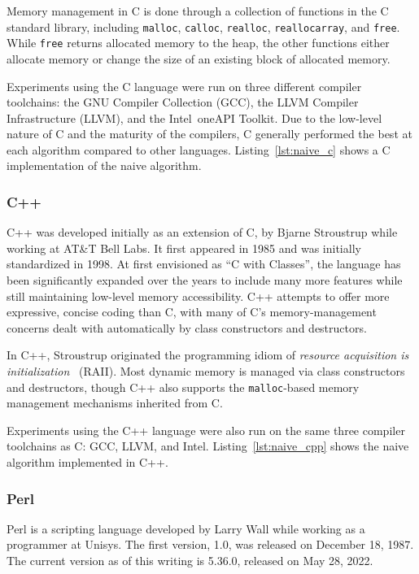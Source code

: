 Memory management in C is done through a collection of functions in the C standard library, including \texttt{malloc}, \texttt{calloc}, \texttt{realloc}, \texttt{reallocarray}, and \texttt{free}. While \texttt{free} returns allocated memory to the heap, the other functions either allocate memory or change the size of an existing block of allocated memory.

Experiments using the C language were run on three different compiler toolchains: the GNU Compiler Collection (GCC), the LLVM Compiler Infrastructure (LLVM), and the Intel\textregistered~oneAPI Toolkit. Due to the low-level nature of C and the maturity of the compilers, C generally performed the best at each algorithm compared to other languages. Listing~\ref{lst:naive_c} shows a C implementation of the naive algorithm.



\subsubsection{C++}

C++ was developed initially as an extension of C, by Bjarne Stroustrup while working at AT\&T Bell Labs. It first appeared in 1985 and was initially standardized in 1998. At first envisioned as ``C with Classes'', the language has been significantly expanded over the years to include many more features while still maintaining low-level memory accessibility. C++ attempts to offer more expressive, concise coding than C, with many of C's memory-management concerns dealt with automatically by class constructors and destructors.

In C++, Stroustrup originated the programming idiom of \textit{resource acquisition is initialization}~\cite{cpp.design.evolution.1994} (RAII). Most dynamic memory is managed via class constructors and destructors, though C++ also supports the \texttt{malloc}-based memory management mechanisms inherited from C.

Experiments using the C++ language were also run on the same three compiler toolchains as C: GCC, LLVM, and Intel. Listing~\ref{lst:naive_cpp} shows the naive algorithm implemented in C++.



\subsubsection{Perl}

Perl is a scripting language developed by Larry Wall while working as a programmer at Unisys. The first version, 1.0, was released on December 18, 1987. The current version as of this writing is 5.36.0, released on May 28, 2022.

